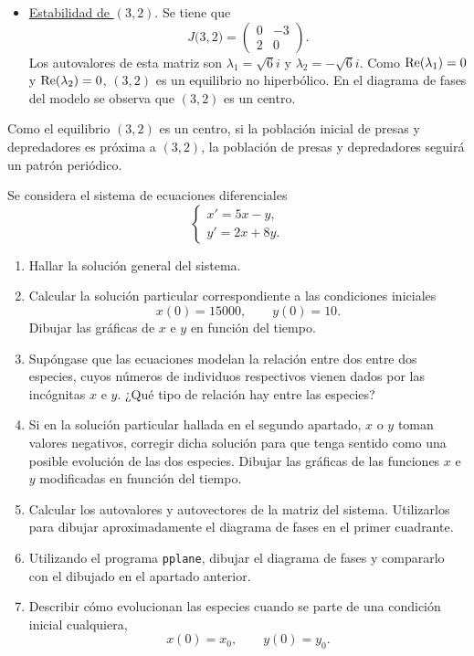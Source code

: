 \documentclass[11pt]{report}
\begin{document}
\begin{solution}
\begin{itemize}
        \item \underline{Estabilidad de $(3,2)$}. Se tiene que
        \[J\bigl(3,2\bigr) = \left(\begin{array}{cc}
            0 & -3 \\
            2 & 0
        \end{array}\right).\]
        Los autovalores de esta matriz son $\lambda_1 = \sqrt{6}i$ y $\lambda_2 = -\sqrt{6}i$. Como $\textup{Re}(\lambda_1)= 0$ y $\textup{Re}(\lambda_2) = 0$, $(3,2)$ es un equilibrio no hiperbólico. En el diagrama de fases del modelo se observa que $(3,2)$ es un centro.
    \end{itemize}

    Como el equilibrio $(3,2)$ es un centro, si la población inicial de presas y depredadores es próxima a $(3,2)$, la población de presas y depredadores seguirá un patrón periódico.  
\end{solution}

\addtocounter{exercise}{1}

\begin{exercise}
    Se considera el sistema de ecuaciones diferenciales
    \[\begin{cases}
        x' = 5x-y, \\
        y' = 2x+8y.
    \end{cases}\]
    \begin{enumerate}
        \item Hallar la solución general del sistema.
        \item Calcular la solución particular correspondiente a las condiciones iniciales
        \[x(0) = 15000, \qquad y(0)=10.\]
        Dibujar las gráficas de $x$ e $y$ en función del tiempo.
        \item Supóngase que las ecuaciones modelan la relación entre dos entre dos especies, cuyos números de individuos respectivos vienen dados por las incógnitas $x$ e $y$. ¿Qué tipo de relación hay entre las especies?
        \item Si en la solución particular hallada en el segundo apartado, $x$ o $y$ toman valores negativos, corregir dicha solución para que tenga sentido como una posible evolución de las dos especies. Dibujar las gráficas de las funciones $x$ e $y$ modificadas en fnunción del tiempo.
        \item Calcular los autovalores y autovectores de la matriz del sistema. Utilizarlos para dibujar aproximadamente el diagrama de fases en el primer cuadrante.
        \item Utilizando el programa \texttt{pplane}, dibujar el diagrama de fases y compararlo con el dibujado en el apartado anterior.
        \item Describir cómo evolucionan las especies cuando se parte de una condición inicial cualquiera,
        \[x(0) = x_0, \qquad y(0) = y_0.\]
    \end{enumerate}
\end{exercise}
\end{document}
